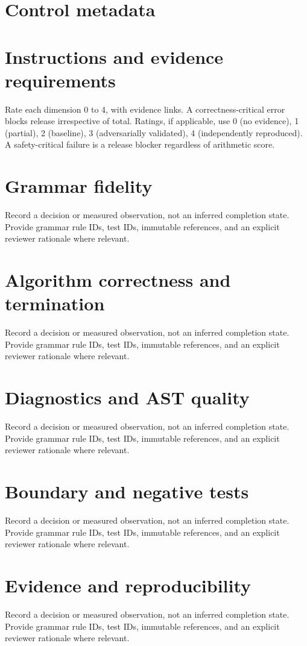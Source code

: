 \documentclass[11pt,letterpaper]{article}
\begin{document}
\makedoctitle\makedocsummary
\tableofcontents\clearpage
\section{Control metadata}
\section{Instructions and evidence requirements}
Rate each dimension 0 to 4, with evidence links. A correctness-critical error blocks release irrespective of total. Ratings, if applicable, use 0 (no evidence), 1 (partial), 2 (baseline), 3 (adversarially validated), 4 (independently reproduced). A safety-critical failure is a release blocker regardless of arithmetic score.
\section{Grammar fidelity}
Record a decision or measured observation, not an inferred completion state. Provide grammar rule IDs, test IDs, immutable references, and an explicit reviewer rationale where relevant.
\PTRating
\section{Algorithm correctness and termination}
Record a decision or measured observation, not an inferred completion state. Provide grammar rule IDs, test IDs, immutable references, and an explicit reviewer rationale where relevant.
\PTRating
\section{Diagnostics and AST quality}
Record a decision or measured observation, not an inferred completion state. Provide grammar rule IDs, test IDs, immutable references, and an explicit reviewer rationale where relevant.
\PTRating
\section{Boundary and negative tests}
Record a decision or measured observation, not an inferred completion state. Provide grammar rule IDs, test IDs, immutable references, and an explicit reviewer rationale where relevant.
\PTRating
\section{Evidence and reproducibility}
Record a decision or measured observation, not an inferred completion state. Provide grammar rule IDs, test IDs, immutable references, and an explicit reviewer rationale where relevant.
\PTRating
\end{document}
